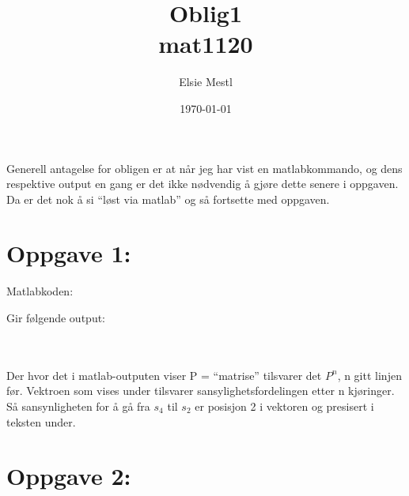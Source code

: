 \documentclass[a4paper, norsk, twoside, 10pt]{article}
\date{\today}
\title{Oblig1 \\ mat1120}
\author{Elsie Mestl}
\begin{document}
\maketitle
\begin{flushleft}

  \def\matrixP{
    \begin{bmatrix}
      1 & 0.7 & 0 & 0 & 0 \\
      0 & 0   & 0.5 & 0 & 0 \\
      0 & 0.3 & 0 & 0.65 & 0 \\
      0 & 0   & 0.5 & 0 & 0 \\
      0 & 0 & 0 & 0.35 & 1 \\
    \end{bmatrix}
  }


  Generell antagelse for obligen er at når jeg har vist en matlabkommando, og dens respektive output en gang er det ikke nødvendig å gjøre dette senere i oppgaven. Da er det nok å si ``løst via matlab'' og så fortsette med oppgaven.

  \section*{Oppgave 1:}
  Matlabkoden:
  
  \newpage
  
  Gir følgende output:
  
  \ \\
  \ \\
  Der hvor det i matlab-outputen viser P = ``matrise'' tilsvarer det $P^{n}$, n gitt linjen før. Vektroen som vises
  under tilsvarer sansylighetsfordelingen etter n kjøringer. Så sansynligheten for å gå fra $s_{4}$ til $s_{2}$ er posisjon 2 i vektoren
  og presisert i teksten under.


  \section*{Oppgave 2:}


\end{flushleft}
\end{document}
